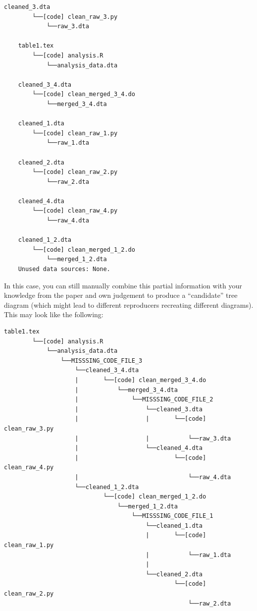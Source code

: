 \documentclass[]{book}
\begin{document}
\begin{verbatim}
cleaned_3.dta
        └──[code] clean_raw_3.py
            └──raw_3.dta

    table1.tex
        └──[code] analysis.R
            └──analysis_data.dta

    cleaned_3_4.dta
        └──[code] clean_merged_3_4.do
            └──merged_3_4.dta

    cleaned_1.dta
        └──[code] clean_raw_1.py
            └──raw_1.dta

    cleaned_2.dta
        └──[code] clean_raw_2.py
            └──raw_2.dta

    cleaned_4.dta
        └──[code] clean_raw_4.py
            └──raw_4.dta

    cleaned_1_2.dta
        └──[code] clean_merged_1_2.do
            └──merged_1_2.dta
    Unused data sources: None.
\end{verbatim}

In this case, you can still manually combine this partial information with your knowledge from the paper and own judgement to produce a ``candidate'' tree diagram (which might lead to different reproducers recreating different diagrams). This may look like the following:

\begin{verbatim}
table1.tex
        └──[code] analysis.R
            └──analysis_data.dta
                └──MISSSING_CODE_FILE_3
                    └──cleaned_3_4.dta
                    |       └──[code] clean_merged_3_4.do
                    |           └──merged_3_4.dta
                    |               └──MISSSING_CODE_FILE_2
                    |                   └──cleaned_3.dta
                    |                   |       └──[code] clean_raw_3.py
                    |                   |           └──raw_3.dta    
                    |                   └──cleaned_4.dta
                    |                           └──[code] clean_raw_4.py
                    |                               └──raw_4.dta
                    └──cleaned_1_2.dta
                            └──[code] clean_merged_1_2.do
                                └──merged_1_2.dta
                                    └──MISSSING_CODE_FILE_1
                                        └──cleaned_1.dta
                                        |       └──[code] clean_raw_1.py
                                        |           └──raw_1.dta
                                        |   
                                        └──cleaned_2.dta
                                                └──[code] clean_raw_2.py
                                                    └──raw_2.dta
\end{verbatim}
\end{document}

